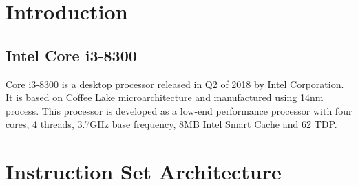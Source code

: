 
\section{Introduction}
\subsection{Intel Core i3-8300}
Core i3-8300 is a desktop processor released in Q2 of 2018 by Intel Corporation. It is based on Coffee Lake microarchitecture and manufactured using 14nm process. This processor is developed as a low-end performance processor with four cores, 4 threads, 3.7GHz base frequency, 8MB Intel Smart Cache and 62 TDP.

\section{Instruction Set Architecture}
